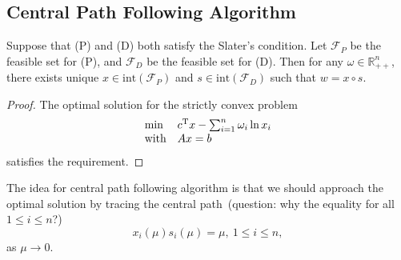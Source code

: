 \subsection{Central Path Following Algorithm}
\begin{theorem}
Suppose that (P) and (D) both satisfy the Slater's condition.
Let $\mathcal{F}_P$ be the feasible set for (P), and $\mathcal{F}_D$ be the feasible set for (D).
Then for any $\omega\in\mathbb{R}^n_{++}$, there exists unique $x\in\text{int}(\mathcal{F}_P)$ and $s\in\text{int}(\mathcal{F}_D)$ such that
$w=x\circ s$.
\end{theorem}
\begin{proof}
The optimal solution for the strictly convex problem
\[
\begin{array}{ll}
\min&c^{\mathrm T} x - \sum_{i=1}^n\omega_i\ln x_i\\
\text{with}&Ax=b
\end{array}
\]
satisfies the requirement.
\end{proof}

The idea for central path following algorithm is that we should approach the optimal solution by tracing the central path~(question: why the equality for all $1\le i\le n$?)
\[
x_i(\mu)s_i(\mu) = \mu, \ 1\le i\le n,
\]
as $\mu\to0$.

